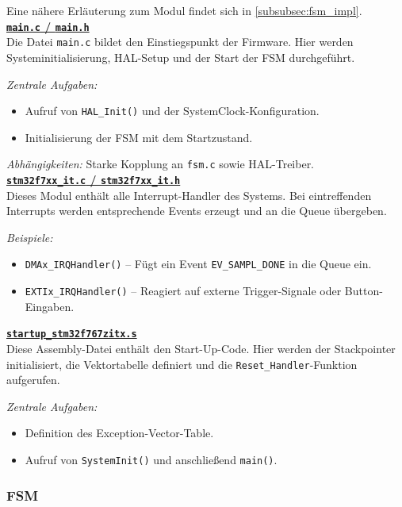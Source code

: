 \documentclass[a4paper, portrait, 12pt]{scrartcl} %
\begin{document}
Eine nähere Erläuterung zum Modul findet sich in \autoref{subsubsec:fsm_impl}.\\

\underline{\textbf{\texttt{main.c} / \texttt{main.h}}}\\
Die Datei \texttt{main.c} bildet den Einstiegspunkt der Firmware. 
Hier werden Systeminitialisierung, HAL-Setup und der Start der FSM durchgeführt.

\emph{Zentrale Aufgaben:}
\begin{itemize}
    \item Aufruf von \texttt{HAL\_Init()} und der SystemClock-Konfiguration.
    \item Initialisierung der FSM mit dem Startzustand.
\end{itemize}

\emph{Abhängigkeiten:} Starke Kopplung an \texttt{fsm.c} sowie HAL-Treiber.\\

\underline{\textbf{\texttt{stm32f7xx\_it.c} / \texttt{stm32f7xx\_it.h}}}\\
Dieses Modul enthält alle Interrupt-Handler des Systems. 
Bei eintreffenden Interrupts werden entsprechende Events erzeugt und an die Queue übergeben.

\emph{Beispiele:}
\begin{itemize}
    \item \texttt{DMAx\_IRQHandler()} – Fügt ein Event \texttt{EV\_SAMPL\_DONE} in die Queue ein.
    \item \texttt{EXTIx\_IRQHandler()} – Reagiert auf externe Trigger-Signale oder Button-Eingaben.
\end{itemize}

\underline{\textbf{\texttt{startup\_stm32f767zitx.s}}}\\
Diese Assembly-Datei enthält den Start-Up-Code. 
Hier werden der Stackpointer initialisiert, die Vektortabelle definiert und die \texttt{Reset\_Handler}-Funktion aufgerufen.

\emph{Zentrale Aufgaben:}
\begin{itemize}
    \item Definition des Exception-Vector-Table.
    \item Aufruf von \texttt{SystemInit()} und anschließend \texttt{main()}.
\end{itemize}

\normalsize
\pagebreak


\subsubsection{FSM}
\label{subsubsec:fsm_impl}
\end{document}
